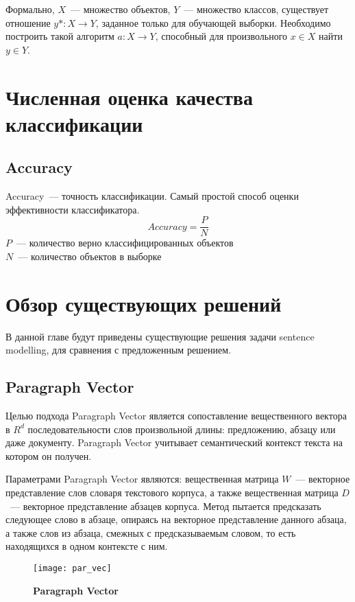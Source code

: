 Формально, $X$~--- множество объектов, $Y$~--- множество классов,
существует отношение $y* : X \rightarrow Y$, заданное только для обучающей выборки.
Необходимо построить такой алгоритм $a: X \rightarrow Y$, способный для произвольного
$x \in X$ найти $y \in Y$.	

\section{Численная оценка качества классификации}

\subsection{Accuracy}
Accuracy~--- точность классификации. Самый простой способ оценки эффективности классификатора.
$$Accuracy =\frac{P}{N}$$
$P$~--- количество верно классифицированных объектов\\
$N$~--- количество объектов в выборке

\section{Обзор существующих решений}

В данной главе будут приведены существующие решения задачи sentence modelling, для сравнения с предложенным решением.

\subsection{Paragraph Vector}


Целью подхода Paragraph Vector является сопоставление вещественного вектора в $R^d$ последовательности слов произвольной длины: предложению, абзацу или даже документу.
Paragraph Vector учитывает семантический контекст текста на котором он получен.

Параметрами Paragraph Vector являются: вещественная матрица $W$~--- векторное представление слов словаря текстового корпуса, а также вещественная матрица $D$~--- векторное представление абзацев корпуса. Метод пытается предсказать следующее слово в абзаце, опираясь на векторное представление данного абзаца, а также слов из абзаца, смежных с предсказываемым словом, то есть находящихся в одном контексте с ним.

\begin{figure}[h]
\texttt{[image: par\_vec]}
\caption{\textbf{Paragraph Vector}}
\label{fig:par_vec}
\end{figure}

